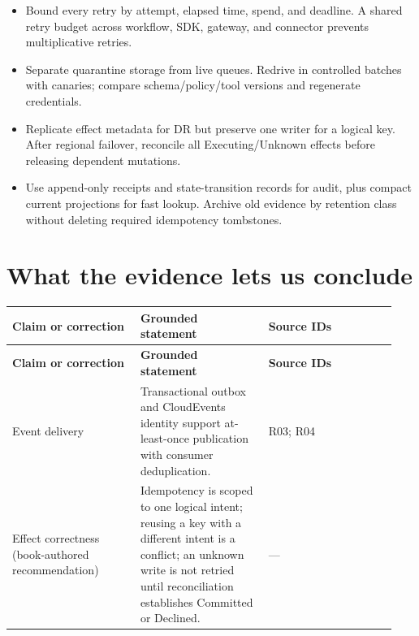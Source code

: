 \begin{itemize}
\item Bound every retry by attempt, elapsed time, spend, and deadline. A shared retry budget across workflow, SDK, gateway, and connector prevents multiplicative retries.

\item Separate quarantine storage from live queues. Redrive in controlled batches with canaries; compare schema/policy/tool versions and regenerate credentials.

\item Replicate effect metadata for DR but preserve one writer for a logical key. After regional failover, reconcile all Executing/Unknown effects before releasing dependent mutations.

\item Use append-only receipts and state-transition records for audit, plus compact current projections for fast lookup. Archive old evidence by retention class without deleting required idempotency tombstones.

\end{itemize}

\section{What the evidence lets us conclude}

\BookTableStart
\small
\begin{longtable}{@{}Y{0.3133\linewidth}Y{0.3133\linewidth}Y{0.3133\linewidth}@{}}
\color{white}\bfseries \textbf{Claim or correction} & \color{white}\bfseries \textbf{Grounded statement} & \color{white}\bfseries \textbf{Source IDs} \\
\endfirsthead
{}
\color{white}\bfseries \textbf{Claim or correction} & \color{white}\bfseries \textbf{Grounded statement} & \color{white}\bfseries \textbf{Source IDs} \\
\endhead
Event delivery & Transactional outbox and CloudEvents identity support at-least-once publication with consumer deduplication. & R03; R04 \\
Effect correctness (book-authored recommendation) & Idempotency is scoped to one logical intent; reusing a key with a different intent is a conflict; an unknown write is not retried until reconciliation establishes Committed or Declined. & — \\
\end{longtable}
\BookTableEnd

